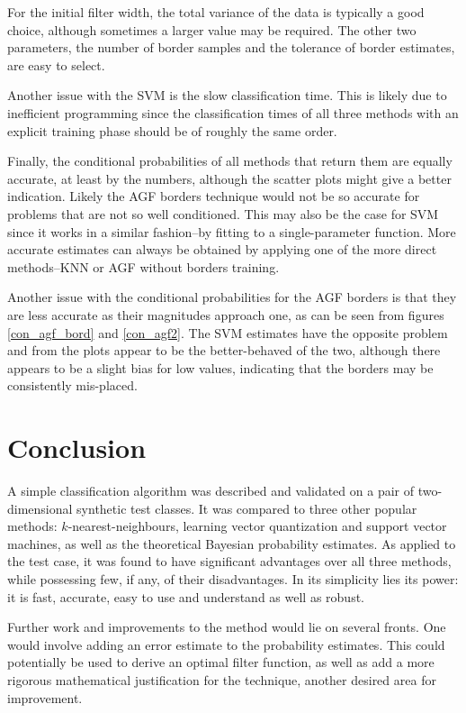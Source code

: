 For the initial filter width, the total variance of the
data is typically a good choice, although sometimes a
larger value may be required.
The other two parameters, the number of border samples and
the tolerance of border estimates, are easy to select.

Another issue with the SVM is the slow classification time.
This is likely due to inefficient programming since the classification
times of all three methods with an explicit training phase
should be of roughly the same order.

Finally, the conditional probabilities of all methods that return them 
are equally accurate, at least by the numbers, although
the scatter plots might give a better indication.
Likely the AGF borders technique
would not be so accurate for problems that are not so well
conditioned.  This may also be the case for SVM since it works in a 
similar fashion--by fitting to a single-parameter function.
\cite{CC01a}  
More accurate estimates can always be obtained by applying one of the
more direct methods--KNN or AGF without borders training.

Another issue with the conditional probabilities for the
AGF borders is that they are less accurate as their magnitudes
approach one, as can be seen from figures \ref{con_agf_bord} and 
\ref{con_agf2}.  The SVM estimates have the opposite
problem and from the plots appear to be the better-behaved of the
two, although there appears to be a slight bias for low values,
indicating that the borders may be consistently mis-placed.

\section{Conclusion}

A simple classification algorithm was described and validated on a
pair of two-dimensional synthetic test classes.  
It was compared to three other popular
methods:  $k$-nearest-neighbours, learning vector quantization and
support vector machines, as well as the theoretical Bayesian probability
estimates.  As applied to the test case,
it was found to have significant advantages over all three
methods, while possessing few, if any, of their disadvantages.
In its simplicity lies its power:  it is fast, accurate, easy to use
and understand as well as robust.

Further work and improvements to the method would lie on several fronts.  
One would involve adding an error estimate to the
probability estimates.  This could potentially be used to derive
an optimal filter function, as well as add a more rigorous
mathematical justification for the technique, another desired area
for improvement.

